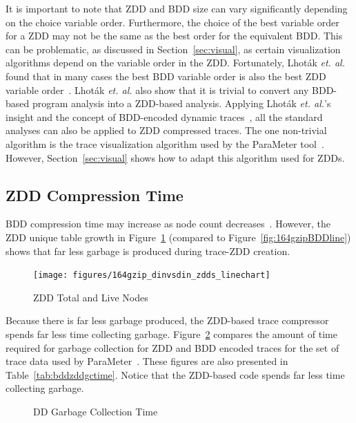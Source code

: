 \documentclass[defaultstyle,11pt]{thesis}
\begin{document}
It is important to note that ZDD and BDD size can vary significantly
depending on the choice variable order.  Furthermore, the choice of
the best variable order for a ZDD may not be the same as the best
order for the equivalent BDD.  This can be problematic, as discussed
in Section~\ref{sec:visual}, as certain visualization algorithms
depend on the variable order in the ZDD.  Fortunately, Lhot\'{a}k
\textit{et. al.} found that in many cases the best BDD variable order
is also the best ZDD variable order~\cite{lhotak:08:lcpc}.  Lhot\'{a}k
\textit{et. al.} also show that it is trivial to convert any BDD-based
program analysis into a ZDD-based analysis.  Applying Lhot\'{a}k
\textit{et. al.}'s insight and the concept of BDD-encoded dynamic
traces~\cite{price:06:cal}, all the standard analyses can also be
applied to ZDD compressed traces.  The one non-trivial algorithm is
the trace visualization algorithm used by the ParaMeter
tool~\cite{price:08:pact}.  However, Section~\ref{sec:visual} shows
how to adapt this algorithm used for ZDDs.

\subsection{ZDD Compression Time}

BDD compression time may increase as node count
decreases~\cite{price:08:msthesis}. However, the ZDD unique
table growth in Figure~\ref{fig:164gzipZDDline} (compared to
Figure~\ref{fig:164gzipBDDline}) shows that far less garbage is
produced during trace-ZDD creation.
\begin{figure}
  \centering
    \texttt{[image: figures/164gzip\_dinvsdin\_zdds\_linechart]}
\caption{ZDD Total and Live Nodes}
\label{fig:164gzipZDDline}
\end{figure}
Because there is far less garbage produced, the ZDD-based trace
compressor spends far less time collecting garbage.
Figure~\ref{fig:zddbddGC} compares the amount of time required for
garbage collection for ZDD and BDD encoded traces for the set of trace
data used by ParaMeter~\cite{price:08:pact}. These figures are also
presented in Table~\ref{tab:bddzddgctime}. Notice that the ZDD-based
code spends far less time collecting garbage.

\begin{figure}
  \centering
  \caption{DD Garbage Collection Time}
  \label{fig:zddbddGC}
\end{figure}
\end{document}
